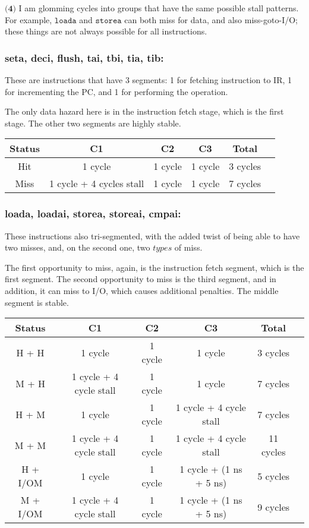 \documentclass[a4paper]{article}
\begin{document}
$\textbf{(4)}$ I am glomming cycles into groups that have the same possible stall patterns. For example, $\texttt{loada}$ and $\texttt{storea}$ can both miss for data, and also miss-goto-I/O; these things are not always possible for all instructions.

\subsubsection{\large seta, deci, flush, tai, tbi, tia, tib:}

These are instructions that have 3 segments: 1 for fetching instruction to IR, 1 for incrementing the PC, and 1 for performing the operation.

The only data hazard here is in the instruction fetch stage, which is the first stage. The other two segments are highly stable.

\begin{center}
\begin{tabular}{|c|c|c|c|c|c|}
\hline
\textbf{Status} & \textbf{C1} & \textbf{C2} & \textbf{C3} & \textbf{Total} \\
\hline
\hline
Hit & 1 cycle & 1 cycle & 1 cycle & 3 cycles \\
\hline
Miss & 1 cycle + 4 cycles stall & 1 cycle & 1 cycle & 7 cycles \\
\hline
\end{tabular}
\end{center}

\subsubsection{\large loada, loadai, storea, storeai, cmpai:}

These instructions also tri-segmented, with the added twist of being able to have two misses, and, on the second one, two $\textit{types}$ of miss.

The first opportunity to miss, again, is the instruction fetch segment, which is the first segment. The second opportunity to miss is the third segment, and in addition, it can miss to I/O, which causes additional penalties. The middle segment is stable.

\begin{center}
\begin{tabular}{|c|c|c|c|c|c|}
\hline
\textbf{Status} & \textbf{C1} & \textbf{C2} & \textbf{C3} & \textbf{Total} \\
\hline
\hline
H + H & 1 cycle & 1 cycle & 1 cycle & 3 cycles \\
\hline
M + H & 1 cycle + 4 cycle stall & 1 cycle & 1 cycle & 7 cycles \\
\hline
H + M & 1 cycle & 1 cycle & 1 cycle + 4 cycle stall & 7 cycles \\
\hline
M + M & 1 cycle + 4 cycle stall & 1 cycle & 1 cycle + 4 cycle stall &11 cycles \\
\hline
H + I/OM & 1 cycle & 1 cycle & 1 cycle + (1 ns + 5 ns) & 5 cycles \\
\hline
M + I/OM & 1 cycle + 4 cycle stall & 1 cycle & 1 cycle + (1 ns + 5 ns) & 9 cycles \\
\hline
\end{tabular}
\end{center}
\end{document}
